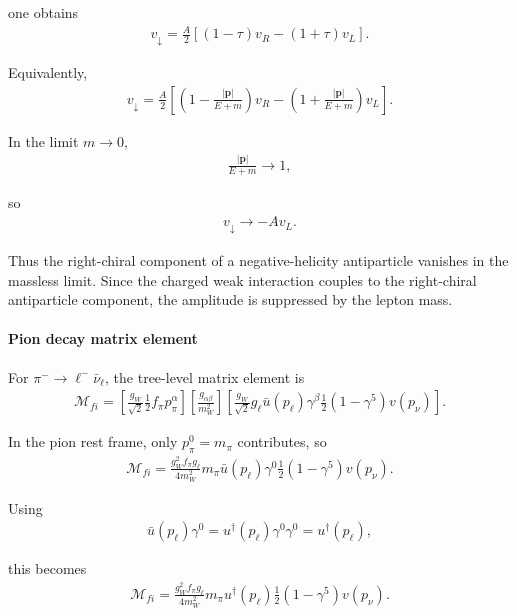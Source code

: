 one obtains
\begin{align}
v_\downarrow
=
\frac{A}{2}
\left[
(1-\tau)v_R
-
(1+\tau)v_L
\right].
\end{align}

Equivalently,
\begin{align}
v_\downarrow
=
\frac{A}{2}
\left[
\left(1-\frac{|\mathbf{p}|}{E+m}\right)v_R
-
\left(1+\frac{|\mathbf{p}|}{E+m}\right)v_L
\right].
\end{align}

In the limit \(m\to 0\),
\begin{align}
\frac{|\mathbf{p}|}{E+m} \to 1,
\end{align}

so
\begin{align}
v_\downarrow \to -A v_L .
\end{align}

Thus the right-chiral component of a negative-helicity antiparticle vanishes in the massless limit. Since the charged weak interaction couples to the right-chiral antiparticle component, the amplitude is suppressed by the lepton mass.

\paragraph{Pion decay matrix element}

For \(\pi^- \to \ell^- \bar{\nu}_\ell\), the tree-level matrix element is
\begin{align}
\mathcal{M}_{fi}
=
\left[
\frac{g_W}{\sqrt{2}}\frac{1}{2} f_\pi p_\pi^\alpha
\right]
\left[
\frac{g_{\alpha\beta}}{m_W^2}
\right]
\left[
\frac{g_W}{\sqrt{2}}g_\ell
\bar{u}(p_\ell)\gamma^\beta
\frac{1}{2}(1-\gamma^5)v(p_\nu)
\right].
\end{align}

In the pion rest frame, only \(p_\pi^0=m_\pi\) contributes, so
\begin{align}
\mathcal{M}_{fi}
=
\frac{g_W^2 f_\pi g_\ell}{4m_W^2}
m_\pi
\bar{u}(p_\ell)\gamma^0
\frac{1}{2}(1-\gamma^5)v(p_\nu).
\end{align}

Using
\begin{align}
\bar{u}(p_\ell)\gamma^0
=
u^\dagger(p_\ell)\gamma^0\gamma^0
=
u^\dagger(p_\ell),
\end{align}

this becomes
\begin{align}
\mathcal{M}_{fi}
=
\frac{g_W^2 f_\pi g_\ell}{4m_W^2}
m_\pi
u^\dagger(p_\ell)
\frac{1}{2}(1-\gamma^5)v(p_\nu).
\end{align}

